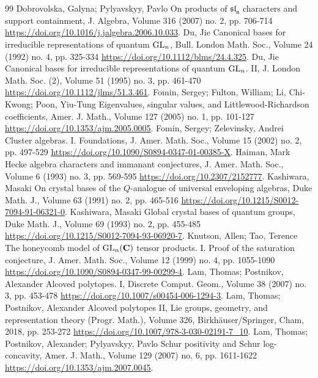 \documentclass[10pt,a4paper]{article}
\theoremstyle{definition}
\numberwithin{equation}{section}
\begin{document}
\begin{thebibliography}{99}
 Dobrovolska, Galyna; Pylyavskyy, Pavlo On products of $\mathfrak{sl}_{\mathfrak{n}}$ characters and support containment, J. Algebra, Volume 316 (2007) no. 2, pp. 706-714 \url{https://doi.org/10.1016/j.jalgebra.2006.10.033}.
 Du, Jie Canonical bases for irreducible representations of quantum ${\rm {GL}}_n$, Bull. London Math. Soc., Volume 24 (1992) no. 4, pp. 325-334 \url{https://doi.org/10.1112/blms/24.4.325}.
 Du, Jie Canonical bases for irreducible representations of quantum ${\rm {GL}}_n$. II, J. London Math. Soc. (2), Volume 51 (1995) no. 3, pp. 461-470 \url{https://doi.org/10.1112/jlms/51.3.461}.
 Fomin, Sergey; Fulton, William; Li, Chi-Kwong; Poon, Yiu-Tung Eigenvalues, singular values, and Littlewood-Richardson coefficients, Amer. J. Math., Volume 127 (2005) no. 1, pp. 101-127 \url{https://doi.org/10.1353/ajm.2005.0005}.
 Fomin, Sergey; Zelevinsky, Andrei Cluster algebras. I. Foundations, J. Amer. Math. Soc., Volume 15 (2002) no. 2, pp. 497-529 \url{https://doi.org/10.1090/S0894-0347-01-00385-X}.
 Haiman, Mark Hecke algebra characters and immanant conjectures, J. Amer. Math. Soc., Volume 6 (1993) no. 3, pp. 569-595 \url{https://doi.org/10.2307/2152777}.
 Kashiwara, Masaki On crystal bases of the ${Q}$-analogue of universal enveloping algebras, Duke Math. J., Volume 63 (1991) no. 2, pp. 465-516 \url{https://doi.org/10.1215/S0012-7094-91-06321-0}.
 Kashiwara, Masaki Global crystal bases of quantum groups, Duke Math. J., Volume 69 (1993) no. 2, pp. 455-485 \url{https://doi.org/10.1215/S0012-7094-93-06920-7}.
 Knutson, Allen; Tao, Terence The honeycomb model of ${\rm {GL}}_n({\bf {C}})$ tensor products. I. Proof of the saturation conjecture, J. Amer. Math. Soc., Volume 12 (1999) no. 4, pp. 1055-1090 \url{https://doi.org/10.1090/S0894-0347-99-00299-4}.
 Lam, Thomas; Postnikov, Alexander Alcoved polytopes. I, Discrete Comput. Geom., Volume 38 (2007) no. 3, pp. 453-478 \url{https://doi.org/10.1007/s00454-006-1294-3}.
 Lam, Thomas; Postnikov, Alexander Alcoved polytopes II, Lie groups, geometry, and representation theory (Progr. Math.), Volume 326, Birkhäuser/Springer, Cham, 2018, pp. 253-272 \url{https://doi.org/10.1007/978-3-030-02191-7_10}.
 Lam, Thomas; Postnikov, Alexander; Pylyavskyy, Pavlo Schur positivity and Schur log-concavity, Amer. J. Math., Volume 129 (2007) no. 6, pp. 1611-1622 \url{https://doi.org/10.1353/ajm.2007.0045}.

\end{thebibliography}
\end{document}
